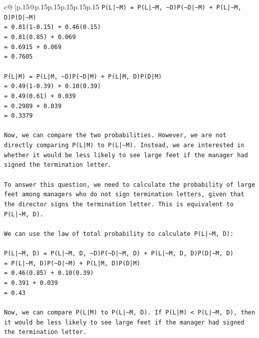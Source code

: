 \documentclass{article}
\begin{document}
{\begin{supertabular}{c@{$\;$}|p{.15\linewidth}@{}p{.15\linewidth}p{.15\linewidth}p{.15\linewidth}p{.15\linewidth}p{.15\linewidth}}
{{{\texttt{P(L|\textasciitilde{}M) = P(L|\textasciitilde{}M, \textasciitilde{}D)P(\textasciitilde{}D|\textasciitilde{}M) + P(L|\textasciitilde{}M, D)P(D|\textasciitilde{}M)} \\
\texttt{= 0.81(1{-}0.15) + 0.46(0.15)} \\
\texttt{= 0.81(0.85) + 0.069} \\
\texttt{= 0.6915 + 0.069} \\
\texttt{= 0.7605} \\
\\ 
\texttt{P(L|M) = P(L|M, \textasciitilde{}D)P(\textasciitilde{}D|M) + P(L|M, D)P(D|M)} \\
\texttt{= 0.49(1{-}0.39) + 0.10(0.39)} \\
\texttt{= 0.49(0.61) + 0.039} \\
\texttt{= 0.2989 + 0.039} \\
\texttt{= 0.3379} \\
\\ 
\texttt{Now, we can compare the two probabilities. However, we are not directly comparing P(L|M) to P(L|\textasciitilde{}M). Instead, we are interested in whether it would be less likely to see large feet if the manager had signed the termination letter.} \\
\\ 
\texttt{To answer this question, we need to calculate the probability of large feet among managers who do not sign termination letters, given that the director signs the termination letter. This is equivalent to P(L|\textasciitilde{}M, D).} \\
\\ 
\texttt{We can use the law of total probability to calculate P(L|\textasciitilde{}M, D):} \\
\\ 
\texttt{P(L|\textasciitilde{}M, D) = P(L|\textasciitilde{}M, D, \textasciitilde{}D)P(\textasciitilde{}D|\textasciitilde{}M, D) + P(L|\textasciitilde{}M, D, D)P(D|\textasciitilde{}M, D)} \\
\texttt{= P(L|\textasciitilde{}M, D)P(\textasciitilde{}D|\textasciitilde{}M) + P(L|M, D)P(D|M)} \\
\texttt{= 0.46(0.85) + 0.10(0.39)} \\
\texttt{= 0.391 + 0.039} \\
\texttt{= 0.43} \\
\\ 
\texttt{Now, we can compare P(L|M) to P(L|\textasciitilde{}M, D). If P(L|M) < P(L|\textasciitilde{}M, D), then it would be less likely to see large feet if the manager had signed the termination letter.} \\
}}}
\end{supertabular}}
\end{document}
